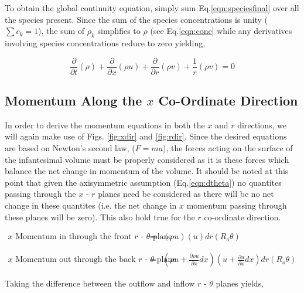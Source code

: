 	To obtain the global continuity equation, simply sum Eq.\ref{eqn:speciesfinal} over all the species present.
Since the sum of the species concentrations is unity ($\sum c_k = 1$), the sum of $\rho_k$ simplifies to $\rho$ 
(see Eq.\ref{eqn:conc} while any derivatives involving species concentrations reduce to zero yielding,

\begin{equation}
	\frac{\partial}{\partial t}(\rho) + \frac{\partial}{\partial x}(\rho u) + \frac{\partial}{\partial r}(\rho v)
	+ \frac{1}{r}(\rho v) = 0
\label{eqn:globalcont}
\end{equation}
	
\subsection{Momentum Along the $x$ Co-Ordinate Direction}

	In order to derive the momentum equations in both the $x$ and $r$ directions, we will again make use of Figs.
\ref{fig:xdir} and \ref{fig:rdir}.  Since the desired equations are based on Newton's second law, ($F=ma$), the forces
acting on the surface of the infantesimal volume must be properly considered as it is these forces which balance the 
net change in momentum of the volume.  It should be noted at this point that given the axisymmetric assumption 
(Eq.\ref{eqn:dtheta}) no quantites passing through the $x$ - $r$ planes need be considered as there will be no net 
change in these quantites (i.e. the net change in $x$ momentum passing through these planes will be zero).  This 
also hold true for the $r$ co-ordinate direction.    

\begin{displaymath}
	\begin{array}{ccc}
		\textrm{$x$ Momentum in through the front $r$ - $\theta$ plane} &
		= & (\rho u)(u)dr(R_o \theta)\\
 		& \\ & \\
		\textrm{$x$ Momentum out through the back $r$ - $\theta$ plane} &
		= & (\rho u + \frac{\partial \rho u}{\partial x}dx)(u + \frac{\partial u}{\partial x}dx)dr(R_o \theta) 
	\end{array}
\end{displaymath}

	Taking the difference between the outflow and inflow $r$ - $\theta$ planes yields,

